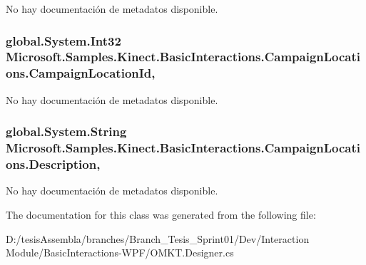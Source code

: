 No hay documentación de metadatos disponible. 

\hypertarget{class_microsoft_1_1_samples_1_1_kinect_1_1_basic_interactions_1_1_campaign_locations_a7310824ef80471421777bc6e0fa0ff9e}{
\subsubsection[{Campaign\-Location\-Id}]{\setlength{\rightskip}{0pt plus 5cm}global.\-System.\-Int32 Microsoft.\-Samples.\-Kinect.\-Basic\-Interactions.\-Campaign\-Locations.\-Campaign\-Location\-Id\hspace{0.3cm}{\ttfamily [get]}, {\ttfamily [set]}}}\label{class_microsoft_1_1_samples_1_1_kinect_1_1_basic_interactions_1_1_campaign_locations_a7310824ef80471421777bc6e0fa0ff9e}


No hay documentación de metadatos disponible. 

\hypertarget{class_microsoft_1_1_samples_1_1_kinect_1_1_basic_interactions_1_1_campaign_locations_abf89910022121ce59a1c01c11bd0611b}{
\subsubsection[{Description}]{\setlength{\rightskip}{0pt plus 5cm}global.\-System.\-String Microsoft.\-Samples.\-Kinect.\-Basic\-Interactions.\-Campaign\-Locations.\-Description\hspace{0.3cm}{\ttfamily [get]}, {\ttfamily [set]}}}\label{class_microsoft_1_1_samples_1_1_kinect_1_1_basic_interactions_1_1_campaign_locations_abf89910022121ce59a1c01c11bd0611b}


No hay documentación de metadatos disponible. 



The documentation for this class was generated from the following file\-:\begin{DoxyCompactItemize}
\item 
D\-:/tesis\-Assembla/branches/\-Branch\-\_\-\-Tesis\-\_\-\-Sprint01/\-Dev/\-Interaction Module/\-Basic\-Interactions-\/\-W\-P\-F/O\-M\-K\-T.\-Designer.\-cs\end{DoxyCompactItemize}
